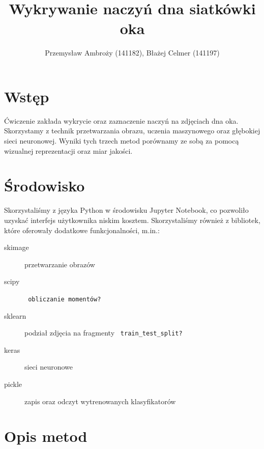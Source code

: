 \documentclass[polish,polish,a4paper]{article}
\title{Wykrywanie naczyń dna siatkówki oka}
\author{Przemysław Ambroży (141182), Błażej Celmer (141197)}
\begin{document}
 
	\maketitle
	
	\section{Wstęp}
		Ćwiczenie zakłada wykrycie oraz zaznaczenie naczyń na zdjęciach dna oka. 
		Skorzystamy z technik przetwarzania obrazu, uczenia maszynowego oraz głębokiej sieci neuronowej.
		Wyniki tych trzech metod porównamy ze sobą za pomocą wizualnej reprezentacji oraz miar jakości.
		
	\section{Środowisko}
		Skorzystaliśmy z języka Python w środowisku Jupyter Notebook,
		co pozwoliło uzyskać interfejs użytkownika niskim kosztem.
		Skorzystaliśmy również z bibliotek, które oferowały dodatkowe funkcjonalności, m.in.:
		
		\begin{description}
			\item[skimage] przetwarzanie obrazów
			\item [scipy] \texttt{\color{red} obliczanie momentów?}
			\item [sklearn] podział zdjęcia na fragmenty \texttt{\color{red} train\_test\_split?}
			\item [keras] sieci neuronowe 
			\item [pickle] zapis oraz odczyt wytrenowanych klasyfikatorów
		\end{description}
		
	\section{Opis metod}
\end{document}
